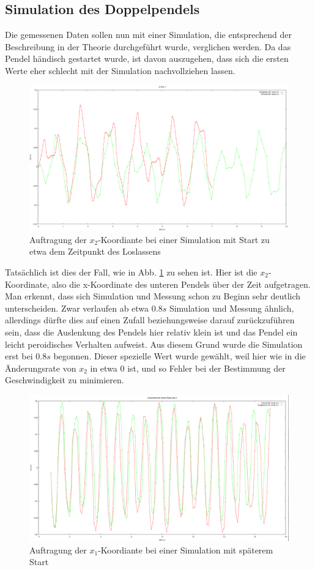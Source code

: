 \subsection{Simulation des Doppelpendels}
Die gemessenen Daten sollen nun mit einer Simulation, die entsprechend der Beschreibung in der Theorie durchgeführt wurde, verglichen werden. Da das Pendel händisch gestartet wurde, ist davon auszugehen, dass sich die ersten Werte eher schlecht mit der Simulation nachvollziehen lassen. 


\begin{figure}
        \includegraphics[width=.9\textwidth]{images/x2_ueber_t_beginn.png}
\caption{Auftragung der $x_2$-Koordiante bei einer Simulation mit Start zu etwa dem Zeitpunkt des Loslassens}
\label{x2_ueber_t_alt}
\end{figure}


Tatsächlich ist dies der Fall, wie in Abb. \ref{x2_ueber_t_alt} zu sehen ist. Hier ist die $x_2$-Koordinate, also die x-Koordinate des unteren Pendels über der Zeit aufgetragen. Man erkennt, dass sich Simulation und Messung schon zu Beginn sehr deutlich unterscheiden. Zwar verlaufen ab etwa $ 0.8 s $ Simulation und Messung ähnlich, allerdings dürfte dies auf einen Zufall beziehungsweise darauf zurückzuführen sein, dass die Auslenkung des Pendels hier relativ klein ist und das Pendel ein leicht peroidisches Verhalten aufweist. 
Aus diesem Grund wurde die Simulation erst bei $ 0.8 s $ begonnen. Dieser spezielle Wert wurde gewählt, weil hier wie in  die Änderungsrate von $x_2$ in etwa 0 ist, und so Fehler bei der Bestimmung der Geschwindigkeit zu minimieren. 

\begin{figure}
        \includegraphics[width=.9\textwidth]{images/x1_ueber_t.png}
\caption{Auftragung der $x_1$-Koordiante bei einer Simulation mit späterem Start}
\label{x1_ueber_t}
\end{figure}

